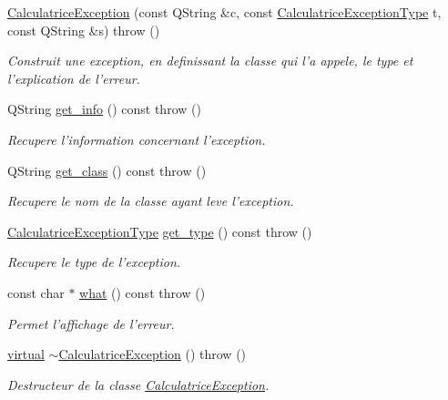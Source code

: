 \begin{DoxyCompactItemize}
\item 
\hyperlink{class_l_o21_1_1_calculatrice_exception_ac792b7b436e37285b3ab89b0015706ed}{\-Calculatrice\-Exception} (const \-Q\-String \&c, const \hyperlink{namespace_l_o21_a4cea05b79a8da799daea8141505d6f59}{\-Calculatrice\-Exception\-Type} t, const \-Q\-String \&s)  throw ()
\begin{DoxyCompactList}\small\item\em \-Construit une exception, en definissant la classe qui l'a appele, le type et l'explication de l'erreur. \end{DoxyCompactList}\item 
\-Q\-String \hyperlink{class_l_o21_1_1_calculatrice_exception_a6c6c50c425e15d81a37b23a5aa8418d4}{get\-\_\-info} () const   throw ()
\begin{DoxyCompactList}\small\item\em \-Recupere l'information concernant l'exception. \end{DoxyCompactList}\item 
\-Q\-String \hyperlink{class_l_o21_1_1_calculatrice_exception_a32451f1412f345fde38c1375dc3b3ecd}{get\-\_\-class} () const   throw ()
\begin{DoxyCompactList}\small\item\em \-Recupere le nom de la classe ayant leve l'exception. \end{DoxyCompactList}\item 
\hyperlink{namespace_l_o21_a4cea05b79a8da799daea8141505d6f59}{\-Calculatrice\-Exception\-Type} \hyperlink{class_l_o21_1_1_calculatrice_exception_a914c2b28071787f54115335f94fd0606}{get\-\_\-type} () const   throw ()
\begin{DoxyCompactList}\small\item\em \-Recupere le type de l'exception. \end{DoxyCompactList}\item 
const char $\ast$ \hyperlink{class_l_o21_1_1_calculatrice_exception_aa635c0f73a8c36fce0a20774c4676e4c}{what} () const   throw ()
\begin{DoxyCompactList}\small\item\em \-Permet l'affichage de l'erreur. \end{DoxyCompactList}\item 
\hypertarget{class_l_o21_1_1_calculatrice_exception_a8091f05ead22041a19a2ae44d38ae41a}{\hyperlink{classvirtual}{virtual} \hyperlink{class_l_o21_1_1_calculatrice_exception_a8091f05ead22041a19a2ae44d38ae41a}{$\sim$\-Calculatrice\-Exception} ()  throw ()}\label{class_l_o21_1_1_calculatrice_exception_a8091f05ead22041a19a2ae44d38ae41a}

\begin{DoxyCompactList}\small\item\em \-Destructeur de la classe \hyperlink{class_l_o21_1_1_calculatrice_exception}{\-Calculatrice\-Exception}. \end{DoxyCompactList}\end{DoxyCompactItemize}


